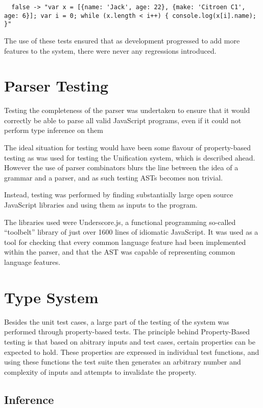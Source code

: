 \documentclass[british, twoside]{bhamthesis}
\theoremstyle{definition}
\begin{document}
    \begin{lstlisting}
  false -> "var x = [{name: 'Jack', age: 22}, {make: 'Citroen C1', age: 6}]; var i = 0; while (x.length < i++) { console.log(x[i].name); }"
    \end{lstlisting}

    The use of these tests ensured that as development progressed to add more features to the system, there were never any regressions introduced.

  \section{Parser Testing}
    Testing the completeness of the parser was undertaken to ensure that it would correctly be able to parse all valid JavaScript programs, even if it could not perform type inference on them

    The ideal situation for testing would have been some flavour of property-based testing as was used for testing the Unification system, which is described ahead. However the use of parser combinators blurs the line between the idea of a grammar and a parser, and as such testing ASTs becomes non trivial.

    Instead, testing was performed by finding substantially large open source JavaScript libraries and using them as inputs to the program.

    The libraries used were Underscore.js, a functional programming so-called ``toolbelt'' library of just over 1600 lines of idiomatic JavaScript. It was used as a tool for checking that every common language feature had been implemented within the parser, and that the AST was capable of representing common language features.

  \section{Type System}
    Besides the unit test cases, a large part of the testing of the system was performed through property-based tests. The principle behind Property-Based testing\autocite{Fink1997} is that based on abitrary inputs and test cases, certain properties can be expected to hold. These properties are expressed in individual test functions, and using these functions the test suite then generates an arbitrary number and complexity of inputs and attempts to invalidate the property.

    \subsection{Inference}
\end{document}

